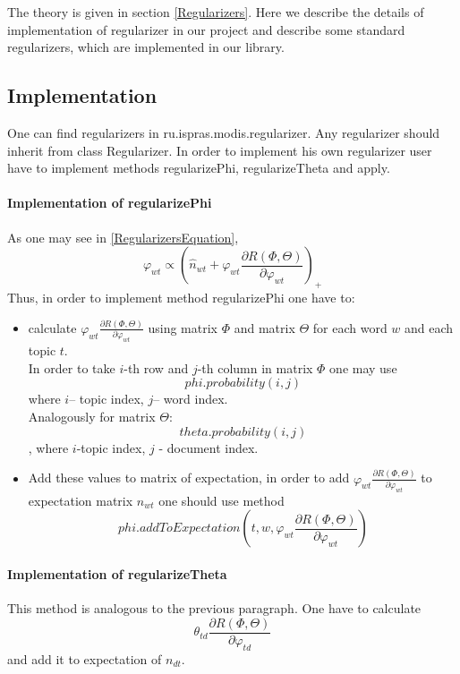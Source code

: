 The theory is given in section \ref{Regularizers}. Here we describe the  details of implementation of regularizer in our project and describe some standard regularizers,
which are implemented in our library.
\subsection*{Implementation}
    One can find regularizers in ru.ispras.modis.regularizer. Any regularizer should inherit from class Regularizer. In order to implement his own regularizer user have to implement methods
    regularizePhi, regularizeTheta and apply.
    \paragraph{Implementation of regularizePhi\\}
    As one may see in \ref{RegularizersEquation},
    \begin{equation} \varphi_{wt} \propto \left(\hat{n}_{wt} + \varphi_{wt} \frac{\partial  R(\Phi, \Theta)}{\partial \varphi_{wt}} \right)_+ \end{equation}
    Thus, in order to implement method regularizePhi one have to:
    \begin{itemize}
	\item calculate $\varphi_{wt} \frac{\partial  R(\Phi, \Theta)}{\partial \varphi_{wt}}$ using matrix $\Phi$ and matrix $\Theta$ for each word $w$ and
	    each topic $t$.\\
	    In order to take $i$\--th row and $j$\--th column in matrix $\Phi$ one may use $$phi.probability(i, j)$$ where $i$\--- topic index,
	    $j$\--- word index.\\
	    Analogously for matrix $\Theta$: $$theta.probability(i, j)$$, where $i$\--topic index, $j$ \-- document index.
	\item Add these values to matrix of expectation, in order to add $\varphi_{wt} \frac{\partial  R(\Phi, \Theta)}{\partial \varphi_{wt}}$ to
	    expectation matrix $n_{wt}$ one should use method\\
	    $$phi.addToExpectation(t, w, \varphi_{wt} \frac{\partial  R(\Phi, \Theta)}{\partial \varphi_{wt}})$$
    \end{itemize}
    
\paragraph{Implementation of regularizeTheta \\}
    This method is analogous to the previous paragraph. One have to calculate $$ \theta_{td}\frac{\partial  R(\Phi, \Theta)}{\partial \varphi_{td}} $$
    and add it to expectation of $n_{dt}$.
